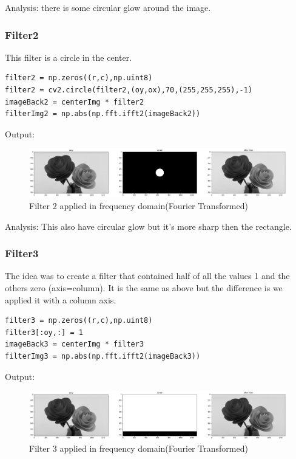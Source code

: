 \documentclass[12pt]{article}
\begin{document}
Analysis: there is some circular glow around the image.
\clearpage


\subsubsection{Filter2}
This filter is a circle in the center.

\begin{verbatim}
filter2 = np.zeros((r,c),np.uint8)
filter2 = cv2.circle(filter2,(oy,ox),70,(255,255,255),-1)
imageBack2 = centerImg * filter2
filterImg2 = np.abs(np.fft.ifft2(imageBack2))
\end{verbatim}

Output:

\begin{figure}[H]
    \centering
    \includegraphics[width=1\textwidth]{assets/kernel2_transform.jpg}
    \caption{Filter 2 applied in frequency domain(Fourier Transformed)}
    \label{fig:Filter2}
\end{figure}


Analysis: This also have circular glow but it's more sharp then the rectangle.

\clearpage




\subsubsection{Filter3}
The idea was to create a filter that contained half of all the values 1 and the others zero (axis=column). It is the same as above but the difference is we applied it with a column axis.

\begin{verbatim}
filter3 = np.zeros((r,c),np.uint8)
filter3[:oy,:] = 1
imageBack3 = centerImg * filter3
filterImg3 = np.abs(np.fft.ifft2(imageBack3))
\end{verbatim}
Output:

\begin{figure}[H]
    \centering
    \includegraphics[width=1\textwidth]{assets/kernel3_transform.jpg}
    \caption{Filter 3 applied in frequency domain(Fourier Transformed)}
    \label{fig:Filter3}
\end{figure}
\end{document}
